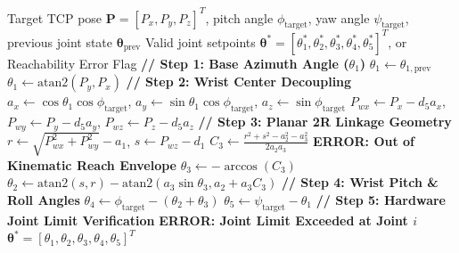 \documentclass[journal]{IEEEtran}
\begin{document}
\begin{algorithm}[!t]
\caption{ARIA Closed-Form Analytical 5-DoF Inverse Kinematics Solver}
\label{alg_analytical_ik}
\begin{algorithmic}[1]
\REQUIRE Target TCP pose $\mathbf{P} = [P_x, P_y, P_z]^T$, pitch angle $\phi_{\text{target}}$, yaw angle $\psi_{\text{target}}$, previous joint state $\boldsymbol{\theta}_{\text{prev}}$
\ENSURE Valid joint setpoints $\boldsymbol{\theta}^* = [\theta_1^*, \theta_2^*, \theta_3^*, \theta_4^*, \theta_5^*]^T$, or Reachability Error Flag
\STATE \textbf{// Step 1: Base Azimuth Angle ($\theta_1$)}
    \STATE $\theta_1 \leftarrow \theta_{1, \text{prev}}$ 
\ELSE
    \STATE $\theta_1 \leftarrow \text{atan2}(P_y, P_x)$
\ENDIF
\STATE \textbf{// Step 2: Wrist Center Decoupling}
\STATE $a_x \leftarrow \cos\theta_1 \cos\phi_{\text{target}}$, $a_y \leftarrow \sin\theta_1 \cos\phi_{\text{target}}$, $a_z \leftarrow \sin\phi_{\text{target}}$
\STATE $P_{wx} \leftarrow P_x - d_5 a_x$, $P_{wy} \leftarrow P_y - d_5 a_y$, $P_{wz} \leftarrow P_z - d_5 a_z$
\STATE \textbf{// Step 3: Planar 2R Linkage Geometry}
\STATE $r \leftarrow \sqrt{P_{wx}^2 + P_{wy}^2} - a_1$, $s \leftarrow P_{wz} - d_1$
\STATE $C_3 \leftarrow \frac{r^2 + s^2 - a_2^2 - a_3^2}{2 a_2 a_3}$
    \RETURN \textbf{ERROR: Out of Kinematic Reach Envelope}
\ENDIF
\STATE $\theta_3 \leftarrow -\arccos(C_3)$ 
\STATE $\theta_2 \leftarrow \text{atan2}(s, r) - \text{atan2}(a_3 \sin\theta_3, a_2 + a_3 C_3)$
\STATE \textbf{// Step 4: Wrist Pitch \& Roll Angles}
\STATE $\theta_4 \leftarrow \phi_{\text{target}} - (\theta_2 + \theta_3)$
\STATE $\theta_5 \leftarrow \psi_{\text{target}} - \theta_1$
\STATE \textbf{// Step 5: Hardware Joint Limit Verification}
        \RETURN \textbf{ERROR: Joint Limit Exceeded at Joint $i$}
    \ENDIF
\ENDFOR
\RETURN $\boldsymbol{\theta}^* = [\theta_1, \theta_2, \theta_3, \theta_4, \theta_5]^T$
\end{algorithmic}
\end{algorithm}
\end{document}
